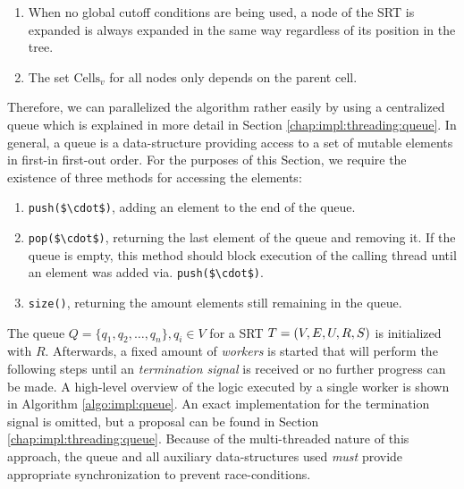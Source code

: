 		\begin{enumerate}
			\item When no global cutoff conditions are being used, a node of the \ac{SRT} is expanded is always expanded in the same way regardless of its position in the tree.
			\item The set $\mathrm{Cells}_v$ for all nodes only depends on the parent cell. 
		\end{enumerate}

		Therefore, we can parallelized the algorithm rather easily by using a centralized queue which is explained in more detail in Section \ref{chap:impl:threading:queue}.
		In general, a queue is a data-structure providing access to a set of mutable elements in first-in first-out order.
		For the purposes of this Section, we require the existence of three methods for accessing the elements:

		\begin{enumerate}
			\item \lstinline[mathescape]|push($\cdot$)|, adding an element to the end of the queue.
			\item \lstinline[mathescape]|pop($\cdot$)|, returning the last element of the queue and removing it. If the queue is empty, this method should block execution of the calling thread until an element was added via. \lstinline[mathescape]|push($\cdot$)|.
			\item \lstinline|size()|, returning the amount elements still remaining in the queue.
		\end{enumerate}

		The queue $Q = \{ q_1, q_2, \ldots, q_n \}, q_i \in V$ for a \ac{SRT} $T = (V, E, U, R, S)$ is initialized with $R$. Afterwards, a fixed amount of \textit{workers} is started that will perform the following steps until an \textit{termination signal} is received or no further progress can be made.
		A high-level overview of the logic executed by a single worker is shown in Algorithm \ref{algo:impl:queue}.
		An exact implementation for the termination signal is omitted, but a proposal can be found in Section \ref{chap:impl:threading:queue}.
		Because of the multi-threaded nature of this approach, the queue and all auxiliary data-structures used \textit{must} provide appropriate synchronization to prevent race-conditions.

